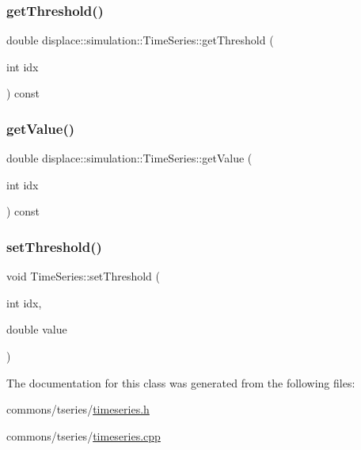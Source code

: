 \mbox{\label{classdisplace_1_1simulation_1_1_time_series_a64ea2d59fa991e9ecc5e791f5b0030f4}} 
\subsubsection{\texorpdfstring{getThreshold()}{getThreshold()}}
{\footnotesize\ttfamily double displace\+::simulation\+::\+Time\+Series\+::get\+Threshold (\begin{DoxyParamCaption}\item[{int}]{idx }\end{DoxyParamCaption}) const\hspace{0.3cm}{\ttfamily [inline]}}

\mbox{\label{classdisplace_1_1simulation_1_1_time_series_aa6417432419821f9b29d38efb33e5f07}} 
\subsubsection{\texorpdfstring{getValue()}{getValue()}}
{\footnotesize\ttfamily double displace\+::simulation\+::\+Time\+Series\+::get\+Value (\begin{DoxyParamCaption}\item[{int}]{idx }\end{DoxyParamCaption}) const\hspace{0.3cm}{\ttfamily [inline]}}

\mbox{\label{classdisplace_1_1simulation_1_1_time_series_a44ad443f4159dd158b7e8f70d12c9d14}} 
\subsubsection{\texorpdfstring{setThreshold()}{setThreshold()}}
{\footnotesize\ttfamily void Time\+Series\+::set\+Threshold (\begin{DoxyParamCaption}\item[{int}]{idx,  }\item[{double}]{value }\end{DoxyParamCaption})}



The documentation for this class was generated from the following files\+:\begin{DoxyCompactItemize}
\item 
commons/tseries/\mbox{\hyperlink{timeseries_8h}{timeseries.\+h}}\item 
commons/tseries/\mbox{\hyperlink{timeseries_8cpp}{timeseries.\+cpp}}\end{DoxyCompactItemize}
